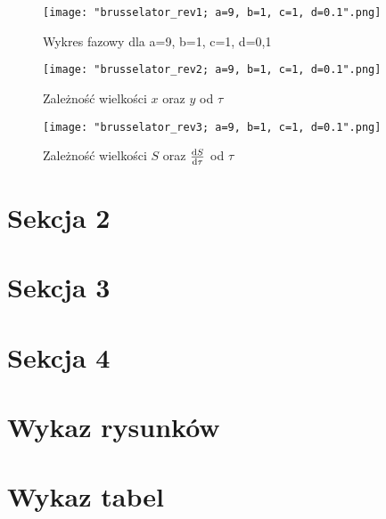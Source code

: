 \documentclass[10pt, a4paper, twoside, onecolumn]{article}
\numberwithin{equation}{section}
\begin{document}
	\begin{figure}[H]
		\centering
		\texttt{[image: "brusselator\_rev1; a=9, b=1, c=1, d=0.1".png]}
		\caption{Wykres fazowy dla a=9, b=1, c=1, d=0,1}
	\end{figure}
	\begin{figure}[H]
		\centering
		\texttt{[image: "brusselator\_rev2; a=9, b=1, c=1, d=0.1".png]}
		\caption{Zależność wielkości \(x\) oraz \(y\) od \(\tau\)}
	\end{figure}
	\begin{figure}[H]
		\centering
		\texttt{[image: "brusselator\_rev3; a=9, b=1, c=1, d=0.1".png]}
		\caption{Zależność wielkości \(S\) oraz \(\dv{S}{\tau}\) od \(\tau\)}
	\end{figure}
	
	
	\section{Sekcja 2}
	\section{Sekcja 3}
	\section{Sekcja 4}
	\pagebreak
	\printbibliography[title=Wykaz literatury]
	\pagebreak
	\section*{Wykaz rysunków}
	\pagebreak
	\section*{Wykaz tabel}
	\pagebreak
\end{document}
